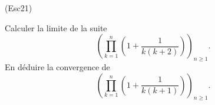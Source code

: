 \begin{tiny}(Esc21)\end{tiny} 
Calculer la limite de la suite 
\begin{displaymath}
\left( \prod_{k=1}^{n}(1+\frac{1}{k(k+2)})\right)_{n\geq 1}.
\end{displaymath}
En déduire la convergence de  
\begin{displaymath}
\left( \prod_{k=1}^{n}(1+\frac{1}{k(k+1)})\right)_{n\geq 1}.
\end{displaymath}
